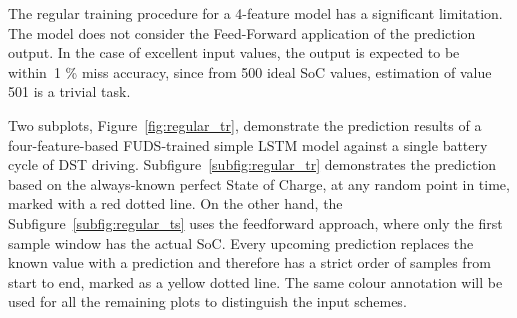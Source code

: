 The regular training procedure for a 4-feature model has a significant limitation. The model does not consider the Feed-Forward application of the prediction output.
In the case of excellent input values, the output is expected to be within~1 \% miss accuracy, since from 500 ideal SoC values, estimation of value 501 is a trivial task.

%
%
Two subplots, \mbox{Figure~\ref{fig:regular_tr}}, demonstrate the prediction results of a four-feature-based FUDS-trained simple LSTM model against a single battery cycle of DST driving.
\mbox{Subfigure~\ref{subfig:regular_tr}} demonstrates the prediction based on the always-known perfect State of Charge, at any random point in time, marked with a red dotted line.
On the other hand, the \mbox{Subfigure~\ref{subfig:regular_ts}} uses the feedforward approach, where only the first sample window has the actual SoC.
Every upcoming prediction replaces the known value with a prediction and therefore has a strict order of samples from start to end, marked as a yellow dotted line.
The same colour annotation will be used for all the remaining plots to distinguish the input schemes.

